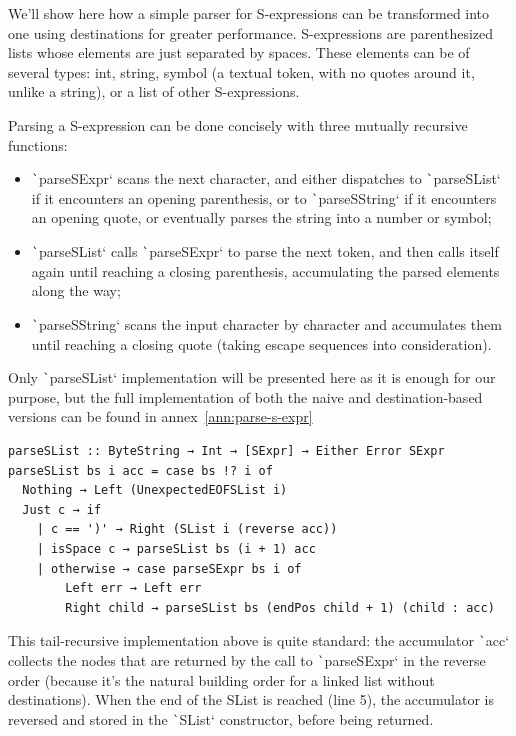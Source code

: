 \documentclass[english]{jflart}
\begin{document}
\medskip

We'll show here how a simple parser for S-expressions can be transformed into one using destinations for greater performance. S-expressions are parenthesized lists whose elements are just separated by spaces. These elements can be of several types: int, string, symbol (a textual token, with no quotes around it, unlike a string), or a list of other S-expressions.

Parsing a S-expression can be done concisely with three mutually recursive functions:
\begin{itemize}
  \item \texttt`parseSExpr` scans the next character, and either dispatches to \texttt`parseSList` if it encounters an opening parenthesis, or to \texttt`parseSString` if it encounters an opening quote, or eventually parses the string into a number or symbol;
  \item \texttt`parseSList` calls \texttt`parseSExpr` to parse the next token, and then calls itself again until reaching a closing parenthesis, accumulating the parsed elements along the way;
  \item \texttt`parseSString` scans the input character by character and accumulates them until reaching a closing quote (taking escape sequences into consideration).
\end{itemize}

Only \texttt`parseSList` implementation will be presented here as it is enough for our purpose, but the full implementation of both the naive and destination-based versions can be found in annex~\ref{ann:parse-s-expr}

{\small
\begin{verbatim}
parseSList :: ByteString → Int → [SExpr] → Either Error SExpr
parseSList bs i acc = case bs !? i of
  Nothing → Left (UnexpectedEOFSList i)
  Just c → if
    | c == ')' → Right (SList i (reverse acc))
    | isSpace c → parseSList bs (i + 1) acc
    | otherwise → case parseSExpr bs i of
        Left err → Left err
        Right child → parseSList bs (endPos child + 1) (child : acc)
\end{verbatim}
}

This tail-recursive implementation above is quite standard: the accumulator \texttt`acc` collects the nodes that are returned by the call to \texttt`parseSExpr` in the reverse order (because it's the natural building order for a linked list without destinations). When the end of the SList is reached (line 5), the accumulator is reversed and stored in the \texttt`SList` constructor, before being returned.
\end{document}
